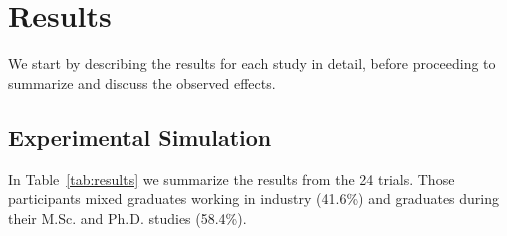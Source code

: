\section{Results}
\label{results}

We start by describing the results for each study in detail, before proceeding to summarize and discuss the observed effects.

\subsection{Experimental Simulation}
\label{sec:expResults}

In Table~\ref{tab:results} we summarize the results from the 24 trials. Those participants mixed graduates working in industry (41.6\%) and graduates during their M.Sc. and Ph.D. studies (58.4\%).



